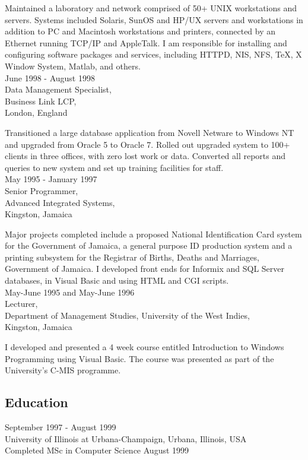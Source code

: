 \documentclass{article}[10]
\begin{document}
Maintained a laboratory and network comprised of 50+ UNIX workstations and servers.  Systems included Solaris, SunOS and HP/UX servers and workstations in addition to PC and Macintosh workstations and printers, connected by an Ethernet running TCP/IP and AppleTalk.  I am responsible for installing and configuring software packages and services, including HTTPD, NIS, NFS, TeX, X Window System, Matlab, and others.\\

\noindent June 1998 - August 1998\\
Data Management Specialist,\\
Business Link LCP,\\
London, England

Transitioned a large database application from Novell Netware to Windows NT and upgraded from Oracle 5 to Oracle 7.  Rolled out upgraded system to 100+ clients in three offices, with zero lost work or data.  Converted all reports and queries to new system and set up training facilities for staff.\\

\noindent May 1995 - January 1997\\
Senior Programmer,\\
Advanced Integrated Systems,\\
Kingston, Jamaica

Major projects completed include a proposed National Identification Card system for the Government of Jamaica, a general purpose ID production system and a printing subsystem for the Registrar of Births, Deaths and Marriages, Government of Jamaica.  I developed front ends for Informix and SQL Server databases, in Visual Basic and using HTML and CGI scripts.\\

\noindent May-June 1995 and May-June 1996\\
Lecturer,\\
Department of Management Studies, University of the West Indies,\\
Kingston, Jamaica

I developed and presented a 4 week course entitled Introduction to Windows Programming using Visual Basic.  The course was presented as part of the University's C-MIS programme.

\subsection*{Education}
\noindent September 1997 - August 1999\\
University of Illinois at Urbana-Champaign, Urbana, Illinois, USA\\
Completed MSc in Computer Science August 1999\\
\end{document}
